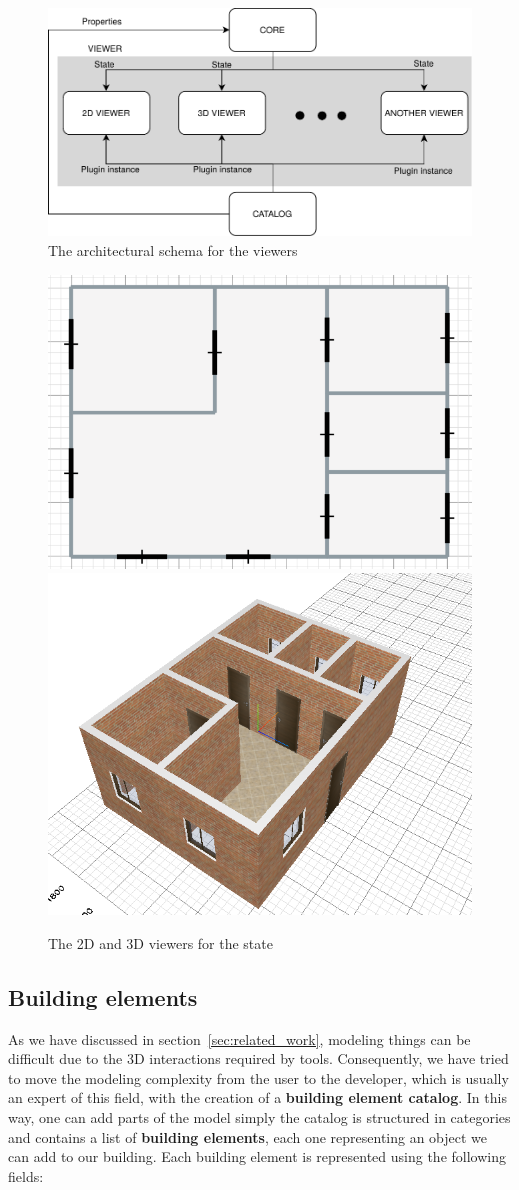 \begin{figure}[htb]
\centering
\includegraphics[width=\linewidth]{contents/images/diagramma-visualizzatori}

\caption{The architectural schema for the viewers}
\label{fig_viewers}
\end{figure}

\begin{figure}[htb]
\centering
\includegraphics[width=0.45\linewidth]{contents/images/2d-viewer}
\includegraphics[width=0.45\linewidth]{contents/images/3d-viewer}
\caption{The 2D and 3D viewers for the state}
\label{fig_viewer}
\end{figure}

\subsection{Building elements}\label{building_elements}

As we have discussed in section~\ref{sec:related_work}, modeling things can be difficult due to the 3D interactions required by tools. Consequently, we have tried to move the modeling complexity from the user to the developer, which is usually an expert of this field, with the creation of a \textbf{building element catalog}. In this way, one can add parts of the model simply  the catalog is structured in categories and contains a list of \textbf{building elements}, each one representing an object we can add to our building. Each building element is represented using the following fields:

